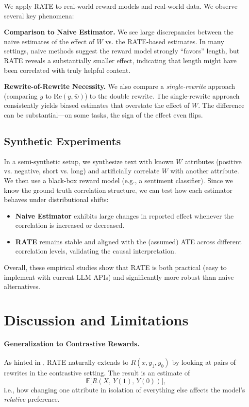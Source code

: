 \documentclass{article}
\theoremstyle{definition}
\newcommand{\EE}{\mathbb{E}}
\begin{document}
We apply RATE to real-world reward models and real-world data. We observe several key phenomena:

\textbf{Comparison to Naive Estimator.} We see large discrepancies between the naive estimates of the effect of $W$ vs. the RATE-based estimates. In many settings, naive methods suggest the reward model strongly ``favors'' length, but RATE reveals a substantially smaller effect, indicating that length might have been correlated with truly helpful content.

\textbf{Rewrite-of-Rewrite Necessity.} We also compare a \emph{single-rewrite} approach (comparing $y$ to $\text{Re}(y, \bar{w})$) to the double rewrite. The single-rewrite approach consistently yields biased estimates that overstate the effect of $W$. The difference can be substantial---on some tasks, the sign of the effect even flips.

\subsection{Synthetic Experiments}

In a semi-synthetic setup, we synthesize text with known $W$ attributes (positive vs. negative, short vs. long) and artificially correlate $W$ with another attribute. We then use a black-box reward model (e.g., a sentiment classifier). Since we know the ground truth correlation structure, we can test how each estimator behaves under distributional shifts:
\begin{itemize}
    \item \textbf{Naive Estimator} exhibits large changes in reported effect whenever the correlation is increased or decreased.
    \item \textbf{RATE} remains stable and aligned with the (assumed) ATE across different correlation levels, validating the causal interpretation.
\end{itemize}

Overall, these empirical studies show that RATE is both practical (easy to implement with current LLM APIs) and significantly more robust than naive alternatives.

\section{Discussion and Limitations}
\label{sec:discussion}

\paragraph{Generalization to Contrastive Rewards.}
As hinted in , RATE naturally extends to $R(x, y_1, y_0)$ by looking at pairs of rewrites in the contrastive setting. The result is an estimate of
\[
\EE\bigl[R(X,\,Y(1),\,Y(0))\bigr],
\]
i.e., how changing one attribute in isolation of everything else affects the model's \emph{relative} preference.
\end{document}
